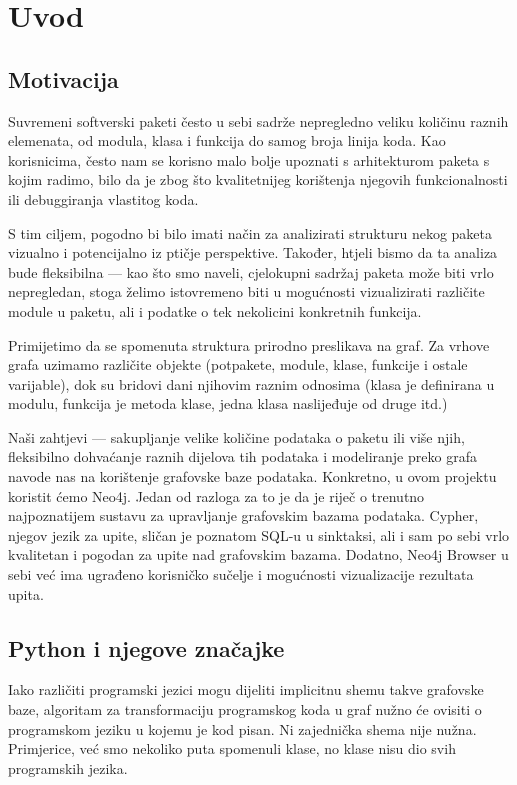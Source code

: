 \section{Uvod} \label{sec-uvod}
\subsection{Motivacija}
Suvremeni softverski paketi često u sebi sadrže nepregledno veliku količinu raznih elemenata, od modula, klasa i funkcija do samog broja linija koda. Kao korisnicima, često nam se korisno malo bolje upoznati s arhitekturom paketa s kojim radimo, bilo da je zbog što kvalitetnijeg korištenja njegovih funkcionalnosti ili debuggiranja vlastitog koda.


S tim ciljem, pogodno bi bilo imati način za analizirati strukturu nekog paketa vizualno i potencijalno iz ptičje perspektive.
 Također, htjeli bismo da ta analiza bude fleksibilna --- kao što smo naveli, cjelokupni sadržaj paketa može biti vrlo nepregledan, stoga želimo istovremeno biti u mogućnosti vizualizirati različite module u paketu, ali i podatke o tek nekolicini konkretnih funkcija.


Primijetimo da se spomenuta struktura prirodno preslikava na graf.
Za vrhove grafa uzimamo različite objekte (potpakete, module, klase, funkcije i ostale varijable), dok su bridovi dani njihovim raznim odnosima (klasa je definirana u modulu, funkcija je metoda klase, jedna klasa naslijeđuje od druge itd.) 


Naši zahtjevi --- sakupljanje velike količine podataka o paketu ili više
njih, fleksibilno dohvaćanje raznih dijelova tih podataka i
modeliranje preko grafa navode nas na korištenje grafovske baze podataka. Konkretno, u ovom projektu koristit ćemo Neo4j.
Jedan od razloga za to je da je riječ o trenutno najpoznatijem sustavu
za upravljanje grafovskim bazama podataka. Cypher, njegov jezik za upite,
sličan je poznatom SQL-u u sinktaksi, ali i sam po sebi vrlo kvalitetan i pogodan za upite nad grafovskim bazama.
Dodatno, Neo4j Browser u sebi već ima ugrađeno korisničko sučelje i
mogućnosti vizualizacije rezultata upita.


\subsection{Python i njegove značajke}
Iako različiti programski jezici mogu dijeliti implicitnu shemu takve
grafovske baze, algoritam za transformaciju programskog koda u graf 
nužno će ovisiti o programskom jeziku u kojemu je kod pisan.
Ni zajednička shema nije nužna. Primjerice, već smo nekoliko puta spomenuli klase, no klase nisu dio svih programskih jezika.


